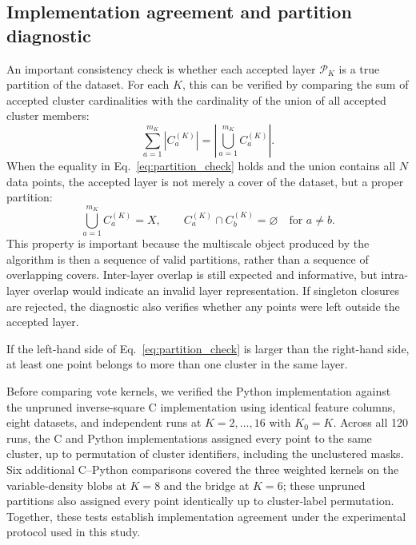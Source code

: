\documentclass[review,12pt]{elsarticle}
\newcommand{\calP}{\mathcal{P}}
\begin{document}

\subsection{Implementation agreement and partition diagnostic}\label{sec:partition_diagnostic}

An important consistency check is whether each accepted layer $\calP_K$ is a true partition of the dataset. For each $K$, this can be verified by comparing the sum of accepted cluster cardinalities with the cardinality of the union of all accepted cluster members:
\begin{equation}
\sum_{a=1}^{m_K}|C_a^{(K)}|=\left|\bigcup_{a=1}^{m_K}C_a^{(K)}\right|.
\label{eq:partition_check}
\end{equation}
When the equality in Eq.~\eqref{eq:partition_check} holds and the union contains all $N$ data points, the accepted layer is not merely a cover of the dataset, but a proper partition:
\begin{equation}
\bigcup_{a=1}^{m_K} C_a^{(K)}=X,
\qquad
C_a^{(K)}\cap C_b^{(K)}=\varnothing
\quad\text{for }a\neq b.
\end{equation}
This property is important because the multiscale object produced by the algorithm is then a sequence of valid partitions, rather than a sequence of overlapping covers. Inter-layer overlap is still expected and informative, but intra-layer overlap would indicate an invalid layer representation. If singleton closures are rejected, the diagnostic also verifies whether any points were left outside the accepted layer.

If the left-hand side of Eq.~\eqref{eq:partition_check} is larger than the right-hand side, at least one point belongs to more than one cluster in the same layer.

Before comparing vote kernels, we verified the Python implementation against
the unpruned inverse-square C implementation using identical feature columns,
eight datasets, and independent runs at $K=2,\ldots,16$ with $K_0=K$.
Across all 120 runs, the C and Python implementations assigned every point
to the same cluster, up to permutation of cluster identifiers, including the
unclustered masks. Six additional C--Python comparisons covered the three
weighted kernels on the variable-density blobs at $K=8$ and the bridge at
$K=6$; these unpruned partitions also assigned every point identically up to
cluster-label permutation. Together, these tests establish implementation
agreement under the experimental protocol used in this study.
\end{document}

